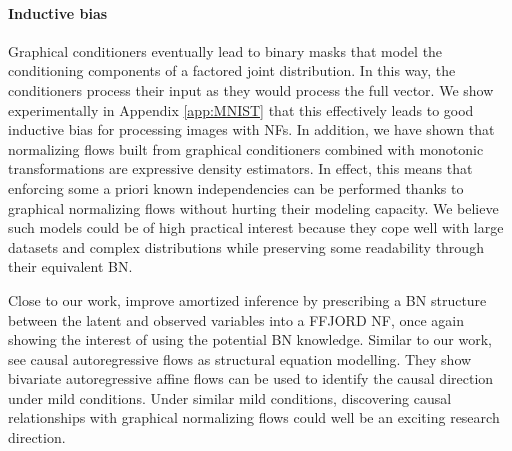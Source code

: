 \paragraph{Inductive bias}
Graphical conditioners eventually lead to binary masks that model the conditioning components of a factored joint distribution. In this way, the conditioners process their input as they would process the full vector.%
We show experimentally in Appendix \ref{app:MNIST} that this effectively leads to good inductive bias for processing images with NFs.
In addition, we have shown that normalizing flows built from graphical conditioners combined with monotonic transformations are expressive density estimators.
In effect, this means that enforcing some a priori known independencies can be performed thanks to graphical normalizing flows without hurting their modeling capacity. We believe such models could be of high practical interest because they cope well with large datasets and complex distributions while preserving some readability through their equivalent BN.

Close to our work, \citet{wood} improve amortized inference by prescribing a BN structure between the latent and observed variables into a FFJORD NF, once again showing the interest of using the potential BN knowledge. Similar to our work, \citet{khemakhem2020causal} see causal autoregressive flows as structural equation modelling. They show bivariate autoregressive affine flows can be used to identify the causal direction under mild conditions. Under similar mild conditions, discovering causal relationships with graphical normalizing flows could well be an exciting research direction.



